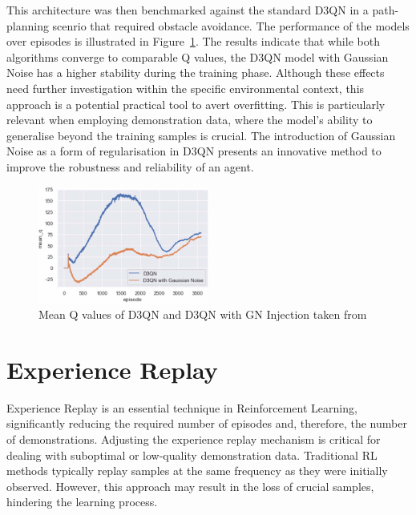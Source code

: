 This architecture was then benchmarked against the standard D3QN in a path-planning scenrio that required obstacle avoidance.
The performance of the models over episodes is illustrated in Figure~\ref{fig:fyp13-results}.
The results indicate that while both algorithms converge to comparable Q values, the D3QN model with Gaussian Noise has a higher stability during the training phase.
Although these effects need further investigation within the specific environmental context, this approach is a potential practical tool to avert overfitting. 
This is particularly relevant when employing demonstration data, where the model's ability to generalise beyond the training samples is crucial. 
The introduction of Gaussian Noise as a form of regularisation in D3QN presents an innovative method to improve the robustness and reliability of an agent.

\begin{figure}[H]
  \centering
  \includegraphics[width=0.5\textwidth]{background/fyp13-noise-results.png}
  \caption{Mean Q values of D3QN and D3QN with GN Injection taken from~\cite{fyp13-noise-injection}}
\label{fig:fyp13-results}
\end{figure}

\section{Experience Replay}
\label{sec:background-experience-replay}


Experience Replay is an essential technique in Reinforcement Learning, significantly reducing the required number of episodes and, therefore, the number of demonstrations.
Adjusting the experience replay mechanism is critical for dealing with suboptimal or low-quality demonstration data.
Traditional RL methods typically replay samples at the same frequency as they were initially observed.
However, this approach may result in the loss of crucial samples, hindering the learning process.

